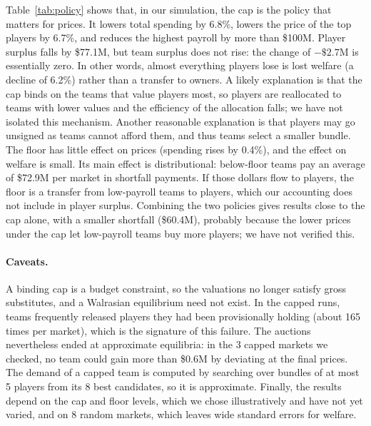 \documentclass{article}
\begin{document}
Table~\ref{tab:policy} shows that, in our simulation, the cap is the policy that matters for prices. It lowers total spending by 6.8\%, lowers the price of the top players by 6.7\%, and reduces the highest payroll by more than \$100M. Player surplus falls by \$77.1M, but team surplus does not rise: the change of $-\$2.7$M is essentially zero. In other words, almost everything players lose is lost welfare (a decline of 6.2\%) rather than a transfer to owners. A likely explanation is that the cap binds on the teams that value players most, so players are reallocated to teams with lower values and the efficiency of the allocation falls; we have not isolated this mechanism. Another reasonable explanation is that players may go unsigned as teams cannot afford them, and thus teams select a smaller bundle. The floor has little effect on prices (spending rises by 0.4\%), and the effect on welfare is small. Its main effect is distributional: below-floor teams pay an average of \$72.9M per market in shortfall payments. If those dollars flow to players, the floor is a transfer from low-payroll teams to players, which our accounting does not include in player surplus. Combining the two policies gives results close to the cap alone, with a smaller shortfall (\$60.4M), probably because the lower prices under the cap let low-payroll teams buy more players; we have not verified this.

\paragraph{Caveats.} A binding cap is a budget constraint, so the valuations no longer satisfy gross substitutes, and a Walrasian equilibrium need not exist. In the capped runs, teams frequently released players they had been provisionally holding (about 165 times per market), which is the signature of this failure. The auctions nevertheless ended at approximate equilibria: in the 3 capped markets we checked, no team could gain more than \$0.6M by deviating at the final prices. The demand of a capped team is computed by searching over bundles of at most 5 players from its 8 best candidates, so it is approximate. Finally, the results depend on the cap and floor levels, which we chose illustratively and have not yet varied, and on 8 random markets, which leaves wide standard errors for welfare.
\end{document}
